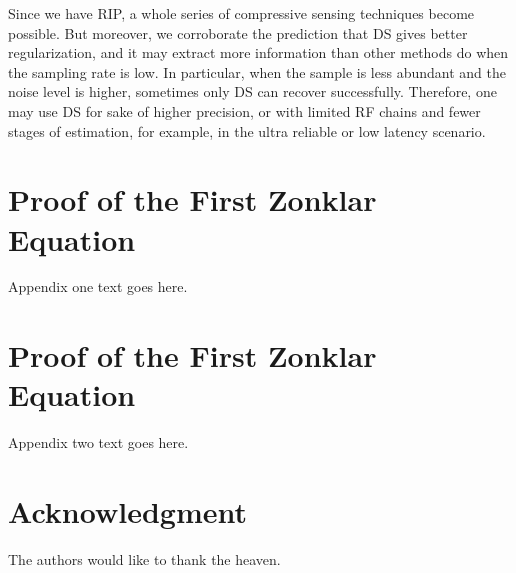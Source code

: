 \documentclass[journal]{IEEEtran}
\begin{document}
Since we have RIP, a whole series of compressive sensing techniques become possible.
But moreover, we corroborate the prediction that DS gives better regularization, and it may extract more information than other methods do when the sampling rate is low.
In particular, when the sample is less abundant and the noise level is higher, sometimes only DS can recover successfully.
Therefore, one may use DS for sake of higher precision, or with limited RF chains and fewer stages of estimation, for example, in the ultra reliable or low latency scenario.


\appendices
\section{Proof of the First Zonklar Equation}
Appendix one text goes here.

\section{Proof of the First Zonklar Equation}
Appendix two text goes here.


\section*{Acknowledgment}

The authors would like to thank the heaven.

\end{document}
